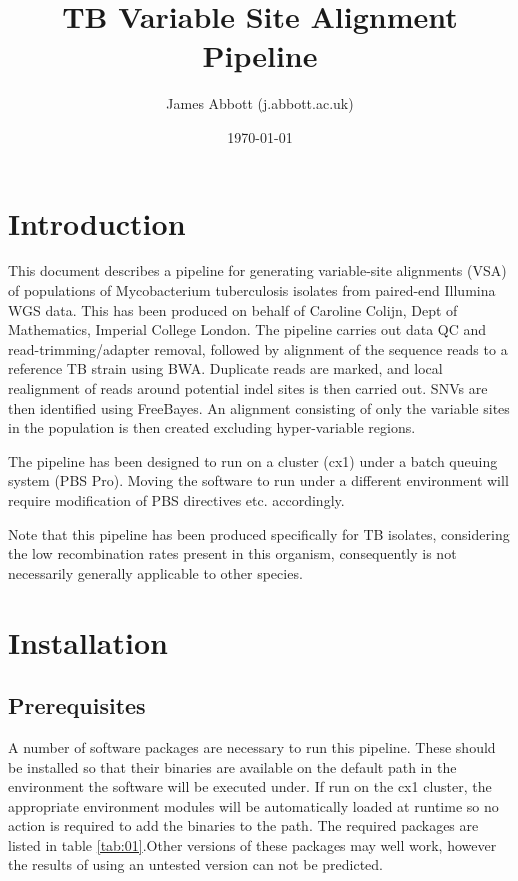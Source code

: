 \documentclass[a4paper,10pt,twoside]{article}
\title{TB Variable Site Alignment Pipeline}
\date{\today}
\author{James Abbott (j.abbott\@imperial.ac.uk)}
\begin{document}
\maketitle
\thispagestyle{fancy} %

\tableofcontents

\section{Introduction}

This document describes a pipeline for generating variable-site alignments
(VSA) of populations of Mycobacterium tuberculosis isolates from paired-end
Illumina WGS data. This has been produced on behalf of Caroline Colijn, Dept of
Mathematics, Imperial College London. The pipeline carries out data QC and
read-trimming/adapter removal, followed by alignment of the sequence reads to a
reference TB strain using BWA.  Duplicate reads are marked, and local
realignment of reads around potential indel sites is then carried out. SNVs are
then identified using FreeBayes. An alignment consisting of only the variable
sites in the population is then created excluding hyper-variable regions.

The pipeline has been designed to run on a cluster (cx1) under a batch queuing
system (PBS Pro). Moving the software to run under a different environment will
require modification of PBS directives etc. accordingly.

Note that this pipeline has been produced specifically for TB isolates,
considering the low recombination rates present in this organism, consequently
is not necessarily generally applicable to other species.

\section{Installation}


\subsection{Prerequisites}

A number of software packages are necessary to run this pipeline. These should
be installed so that their binaries are available on the default path in the
environment the software will be executed under. If run on the cx1 cluster, the
appropriate environment modules will be automatically loaded at runtime so no
action is required to add the binaries to the path. The required packages are
listed in table \ref{tab:01}.Other versions of these packages may well work,
however the results of using an untested version can not be predicted.
\end{document}
